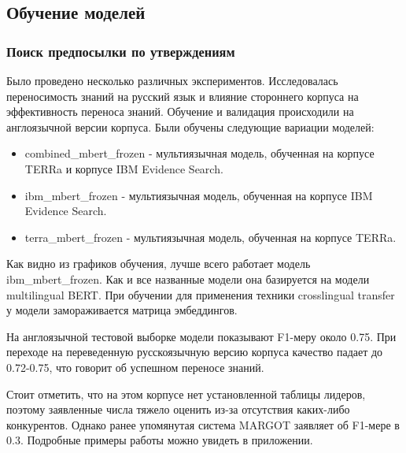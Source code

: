 \subsection{Обучение моделей}
\subsubsection{Поиск предпосылки по утверждениям}

Было проведено несколько различных экспериментов. Исследовалась переносимость знаний на русский язык и влияние стороннего корпуса на эффективность переноса знаний. Обучение и валидация происходили на англоязычной версии корпуса. Были обучены следующие вариации моделей:
\begin{itemize}
    \item combined\_mbert\_frozen - мультиязычная модель, обученная на корпусе TERRa и корпусе IBM Evidence Search.
    \item ibm\_mbert\_frozen - мультиязычная модель, обученная на корпусе IBM Evidence Search.
    \item terra\_mbert\_frozen - мультиязычная модель, обученная на корпусе TERRa.
\end{itemize}

Как видно из графиков обучения, лучше всего работает модель ibm\_mbert\_frozen. Как и все названные модели она базируется на модели multilingual BERT. При обучении для применения техники crosslingual transfer у модели замораживается матрица эмбеддингов.

На англоязычной тестовой выборке модели показывают F1-меру около 0.75. При переходе на переведенную русскоязычную версию корпуса качество падает до 0.72-0.75, что говорит об успешном переносе знаний.

Стоит отметить, что на этом корпусе нет установленной таблицы лидеров, поэтому заявленные числа тяжело оценить из-за отсутствия каких-либо конкурентов. Однако ранее упомянутая система MARGOT заявляет об F1-мере в 0.3. Подробные примеры работы можно увидеть в приложении.

